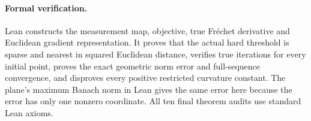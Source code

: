 \documentclass[11pt]{article}
\begin{document}
\paragraph{Formal verification.} Lean constructs the measurement map, objective, true Fr\'echet derivative and Euclidean gradient representation. It proves that the actual hard threshold is sparse and nearest in squared Euclidean distance, verifies true iterations for every initial point, proves the exact geometric norm error and full-sequence convergence, and disproves every positive restricted curvature constant. The plane's maximum Banach norm in Lean gives the same error here because the error has only one nonzero coordinate. All ten final theorem audits use standard Lean axioms.
\end{document}
